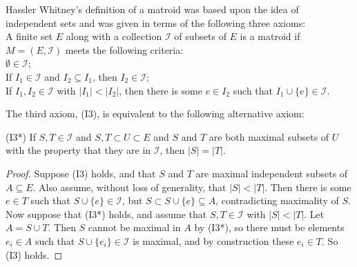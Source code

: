 \documentclass[12pt]{article}
\begin{document}
Hassler Whitney's definition of a matroid was based upon the idea of independent sets and was given in terms of the following three axioms:\\

A finite set $E$ along with a collection $\mathcal{I}$ of subsets of $E$ is a matroid if $M=(E,\mathcal{I})$ meets the following criteria:\\
 $\emptyset\in\mathcal{I}$;\\
 If $I_1\in\mathcal{I}$ and $I_2\subseteq I_1$, then $I_2\in\mathcal{I}$;\\
 If $I_1,I_2\in\mathcal{I}$ with $|I_1|<|I_2|$, then there is some $e\in I_2$ such that $I_1\cup\{e\}\in\mathcal{I}$.

The third axiom, (I3), is equivalent to the following alternative axiom:

\noindent(I3*) If $S,T\in \mathcal{I}$ and $S,T\subset U\subset E$ and $S$ and $T$ are both maximal subsets of $U$ with the property that they are in $\mathcal{I}$, then $|S|=|T|$.

\begin{proof} Suppose {(I3)} holds, and that $S$ and $T$ are maximal independent subsets of $A\subseteq E$. Also assume, without loss of generality, that $|S|<|T|$. Then there is some $e\in T$ such that $S\cup\{e\}\in\mathcal{I}$, but $S\subset S\cup\{e\} \subseteq A$, contradicting maximality of $S$.\\
Now suppose that {(I3*)} holds, and assume that $S,T \in \mathcal{I}$ with $|S|<|T|$. Let $A=S\cup T$. Then $S$ cannot be maximal in $A$ by {(I3*)}, so there must be elements $e_i\in A$ such that $S\cup\{e_i\}\in\mathcal{I}$ is maximal, and by construction these $e_i\in T$. So {(I3)} holds.
\end{proof}
\end{document}

